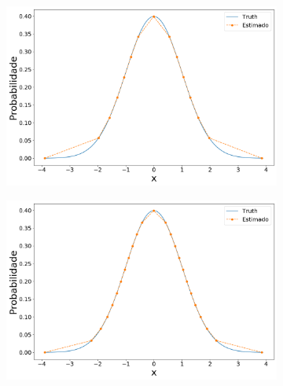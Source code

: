 \begin{figure}[H]
	\centering
	\begin{subfigure}[b]{0.45\textwidth}
		\centering 
		\includegraphics[width=\linewidth]{./figuras/iPDF1_normal_15_1_0_0}
		\caption{}
		\label{fig:ipdfnorm15}
	\end{subfigure}
	\hfill
	\begin{subfigure}[b]{0.45\textwidth}
		\centering 
		\includegraphics[width=\linewidth]{./figuras/iPDF1_normal_25_1_0_0}
		\caption{}
		\label{fig:ipdfnorm25}
	\end{subfigure}
	

\end{figure}
